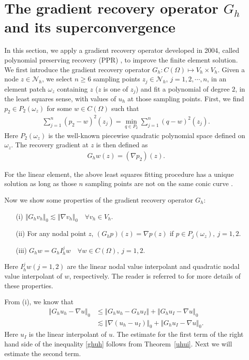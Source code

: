 \documentclass[leqno,final]{siamltex}
\numberwithin{equation}{section}
\newcommand{\norm}[1]{\left\Vert#1\right\Vert}
\newcommand{\nn}{\nonumber}
\newcommand{\ls}{\lesssim}
\newcommand{\na}{\nabla}
\newcommand{\om}{\omega}
\newcommand{\Om}{\Omega}
\newcommand{\N}{\mathcal{N}}
\newcommand{\eq}[1]{\begin{align}#1\end{align}}
\begin{document}
\section{The gradient recovery operator $G_h$ and its superconvergence} \label{gra}
In this section, we apply a gradient recovery operator developed in 2004, called polynomial preserving
recovery (PPR) \cite{nz04,z04,zn05}, to improve the finite element solution.
We first introduce the gradient recovery operator $G_h:C(\Om)\mapsto V_h\times V_h$.
Given a node $z\in\N_h$, we select $n\geq6$ sampling points $z_j\in\N_h$, $j=1,2,\cdots,n$, in an element
patch $\om_z$ containing $z$ ($z$ is one of $z_j$) and fit a polynomial of degree $2$, in the least
squares sense, with values of $u_h$ at those sampling points. First, we find $p_2\in P_2(\om_z)$ for some
$w\in C(\Om)$ such that
\eq{ \sum_{j=1}^n(p_2-w)^2(z_j)=\min_{q\in P_2}\sum_{j=1}^n(q-w)^2(z_j). }
Here $P_2(\om_z)$ is the well-known piecewise quadratic polynomial space defined on $\om_z$.
The recovery gradient at $z$ is then defined as
\eq{ G_hw(z)=(\na p_2)(z). }

For the linear element, the above least squares fitting procedure has a unique
solution as long as those $n$ sampling points are not on the same conic curve \cite{nz04}.

Now we show some properties of the gradient recovery operator $G_h$:
\begin{itemize}
  \item[(i)] $\norm{G_hv_h}_0\ls\norm{\na v_h}_0\quad \forall v_h\in V_h$.
  \item[(ii)] {For} any nodal point $z$, $(G_hp)(z)=\na p(z)$ if $p\in P_j(\om_z),\ j=1,2$.
  \item[(iii)] $G_hw=G_hI_h^jw\quad\forall w\in C(\Om),\ j=1,2$.
\end{itemize}
Here $I_h^jw(j=1,2)$ are the linear nodal value interpolant and quadratic nodal value interpolant of $w$, respectively. The reader is referred to \cite{nz04,wz07,z04,zn05} for more details of these properties.

From (i), we know that
\eq{ \norm{G_hu_h-\na u}_0 &\leq \norm{G_hu_h-G_hu_I} + \norm{G_hu_I-\na u}_0 \label{ghuh}\\
&\ls \norm{\na(u_h-u_I)}_0 + \norm{G_hu_I-\na u}_0.\nn}
Here $u_I$ is the linear interpolant of $u$. The estimate for the first term of the
right hand side of the inequality \eqref{ghuh} follows from Theorem~\ref{uhui}.
Next we will estimate the second term.
\end{document}
